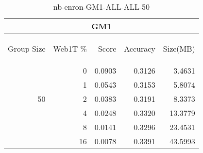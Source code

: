 \begin{center}
\begin{table}[htbp] 
 \begin{center}
\begin{tabular}{ | r | r | r | r | r |}
\hline
\multicolumn{5}{|c|}{GM1}\\
\hline
\begin{sideways}Group Size\end{sideways} & \begin{sideways}Web1T \%\end{sideways} & \begin{sideways}Score\end{sideways} & \begin{sideways}Accuracy\end{sideways} & \begin{sideways}Size(MB)\end{sideways}\\
\hline
\multirow{5}{*}{50}
 & 0 & 0.0903 & 0.3126 & 3.4631\\ \cline{2-5}
 & 1 & 0.0543 & 0.3153 & 5.8074\\ \cline{2-5}
 & 2 & 0.0383 & 0.3191 & 8.3373\\ \cline{2-5}
 & 4 & 0.0248 & 0.3320 & 13.3779\\ \cline{2-5}
 & 8 & 0.0141 & 0.3296 & 23.4531\\ \cline{2-5}
 & 16 & 0.0078 & 0.3391 & 43.5993\\ \cline{2-5}
\hline
\end{tabular}
\caption{nb-enron-GM1-ALL-ALL-50}
\label{table:nb-enron-GM1-ALL-ALL-50}
\end{center}
 \end{table}
\end{center}

